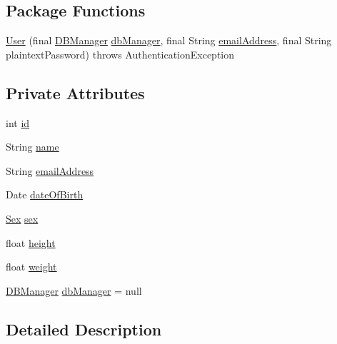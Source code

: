 \subsection*{Package Functions}
\begin{DoxyCompactItemize}
\item 
\mbox{\hyperlink{classcom_1_1activitytracker_1_1_user_ae9f2a2555aa41e80ade28223907e01ab}{User}} (final \mbox{\hyperlink{classcom_1_1activitytracker_1_1_d_b_manager}{D\+B\+Manager}} \mbox{\hyperlink{classcom_1_1activitytracker_1_1_user_a8c8b36433447a235f2b4940b92e839c1}{db\+Manager}}, final String \mbox{\hyperlink{classcom_1_1activitytracker_1_1_user_ac2fdb9a858d0295e52c5f8bc179e3137}{email\+Address}}, final String plaintext\+Password)  throws Authentication\+Exception
\end{DoxyCompactItemize}
\subsection*{Private Attributes}
\begin{DoxyCompactItemize}
\item 
int \mbox{\hyperlink{classcom_1_1activitytracker_1_1_user_adc05319380c2cbb37477ab5aab86317c}{id}}
\item 
String \mbox{\hyperlink{classcom_1_1activitytracker_1_1_user_a49bfb4c8ebf8b7a377df01b5f0b2d7bc}{name}}
\item 
String \mbox{\hyperlink{classcom_1_1activitytracker_1_1_user_ac2fdb9a858d0295e52c5f8bc179e3137}{email\+Address}}
\item 
Date \mbox{\hyperlink{classcom_1_1activitytracker_1_1_user_a40b0d4ce16246066c0e948edef864d94}{date\+Of\+Birth}}
\item 
\mbox{\hyperlink{enumcom_1_1activitytracker_1_1_user_1_1_sex}{Sex}} \mbox{\hyperlink{classcom_1_1activitytracker_1_1_user_adcbddd2e965af4e227f7cf0582a3e13d}{sex}}
\item 
float \mbox{\hyperlink{classcom_1_1activitytracker_1_1_user_a83cdfe6f520a4e18e8710e8e11f8c3d6}{height}}
\item 
float \mbox{\hyperlink{classcom_1_1activitytracker_1_1_user_a8a30c6c08983e513b462bcc035434c9e}{weight}}
\item 
\mbox{\hyperlink{classcom_1_1activitytracker_1_1_d_b_manager}{D\+B\+Manager}} \mbox{\hyperlink{classcom_1_1activitytracker_1_1_user_a8c8b36433447a235f2b4940b92e839c1}{db\+Manager}} = null
\end{DoxyCompactItemize}


\subsection{Detailed Description}


